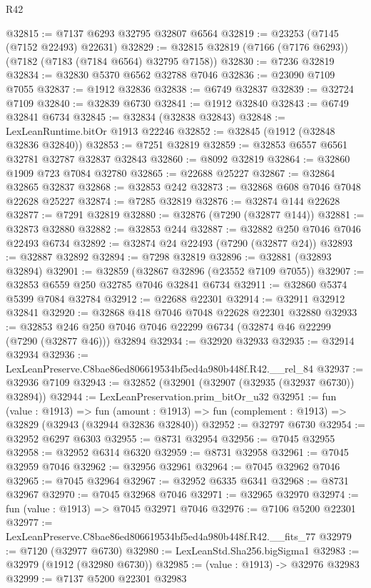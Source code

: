 \begin{lexlean}{R42}
\begin{coremodule}
{@32815 := @7137 @6293 @32795 @32807 @6564
@32819 := @23253 (@7145 (@7152 @22493) @22631)
@32829 := @32815 @32819 (@7166 (@7176 @6293)) (@7182 (@7183 (@7184 @6564) @32795 @7158))
@32830 := @7236 @32819
@32834 := @32830 @5370 @6562 @32788 @7046
@32836 := @23090 @7109 @7055
@32837 := @1912 @32836
@32838 := @6749 @32837
@32839 := @32724 @7109
@32840 := @32839 @6730
@32841 := @1912 @32840
@32843 := @6749 @32841 @6734
@32845 := @32834 (@32838 @32843)
@32848 := LexLeanRuntime.bitOr @1913 @22246
@32852 := @32845 (@1912 (@32848 @32836 @32840))
@32853 := @7251 @32819
@32859 := @32853 @6557 @6561 @32781 @32787 @32837 @32843
@32860 := @8092 @32819
@32864 := @32860 @1909 @723 @7084 @32780
@32865 := @22688 @25227
@32867 := @32864 @32865 @32837
@32868 := @32853 @242
@32873 := @32868 @608 @7046 @7048 @22628 @25227
@32874 := @7285 @32819
@32876 := @32874 @144 @22628
@32877 := @7291 @32819
@32880 := @32876 (@7290 (@32877 @144))
@32881 := @32873 @32880
@32882 := @32853 @244
@32887 := @32882 @250 @7046 @7046 @22493 @6734
@32892 := @32874 @24 @22493 (@7290 (@32877 @24))
@32893 := @32887 @32892
@32894 := @7298 @32819
@32896 := @32881 (@32893 @32894)
@32901 := @32859 (@32867 @32896 (@23552 @7109 @7055))
@32907 := @32853 @6559 @250 @32785 @7046 @32841 @6734
@32911 := @32860 @5374 @5399 @7084 @32784
@32912 := @22688 @22301
@32914 := @32911 @32912 @32841
@32920 := @32868 @418 @7046 @7048 @22628 @22301 @32880
@32933 := @32853 @246 @250 @7046 @7046 @22299 @6734 (@32874 @46 @22299 (@7290 (@32877 @46))) @32894
@32934 := @32920 @32933
@32935 := @32914 @32934
@32936 := LexLeanPreserve.C8bae86ed806619534bf5ed4a980b448f.R42.__rel_84
@32937 := @32936 @7109
@32943 := @32852 (@32901 (@32907 (@32935 (@32937 @6730)) @32894))
@32944 := LexLeanPreservation.prim_bitOr_u32
@32951 := fun (value : @1913) =>
  fun (amount : @1913) => fun (complement : @1913) => @32829 (@32943 (@32944 @32836 @32840))
@32952 := @32797 @6730
@32954 := @32952 @6297 @6303
@32955 := @8731 @32954
@32956 := @7045 @32955
@32958 := @32952 @6314 @6320
@32959 := @8731 @32958
@32961 := @7045 @32959 @7046
@32962 := @32956 @32961
@32964 := @7045 @32962 @7046
@32965 := @7045 @32964
@32967 := @32952 @6335 @6341
@32968 := @8731 @32967
@32970 := @7045 @32968 @7046
@32971 := @32965 @32970
@32974 := fun (value : @1913) => @7045 @32971 @7046
@32976 := @7106 @5200 @22301
@32977 := LexLeanPreserve.C8bae86ed806619534bf5ed4a980b448f.R42.__fits_77
@32979 := @7120 (@32977 @6730)
@32980 := LexLeanStd.Sha256.bigSigma1
@32983 := @32979 (@1912 (@32980 @6730))
@32985 := (value : @1913) -> @32976 @32983
@32999 := @7137
    @5200
    @22301
    @32983
}
\end{coremodule}
\end{lexlean}
